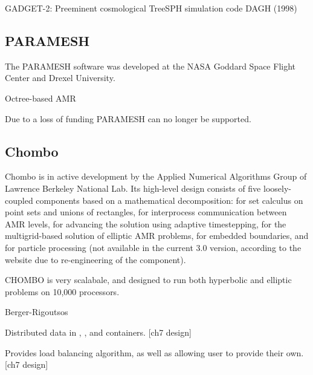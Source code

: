 \documentclass[14pt,letter]{article}
\begin{document}
GADGET-2: Preeminent cosmological TreeSPH simulation code
DAGH (1998)

\subsection{PARAMESH}

\nocite{wwwparamesh}
\nocite{MaOl00} %
\nocite{OlMa05}
\nocite{Ol06}

The PARAMESH software was developed at the NASA Goddard Space Flight
Center and Drexel University.

Octree-based AMR


Due to a loss of funding PARAMESH can no longer be supported.

\subsection{Chombo}

\nocite{wwwchombo}
\nocite{CoGr09}

Chombo is in active development by the Applied Numerical Algorithms
Group of Lawrence Berkeley National Lab.  Its high-level design
consists of five loosely-coupled components based on a mathematical
decomposition:  for set calculus on point sets and
unions of rectangles,  for interprocess communication
between AMR levels,  for advancing the solution
using adaptive timestepping,  for the
multigrid-based solution of elliptic AMR problems,  for
embedded boundaries, and  for particle processing
(not available in the current 3.0 version, according to the website
due to re-engineering of the component).

CHOMBO is very scalabale, and designed to run both hyperbolic and
elliptic problems on 10,000 processors.

Berger-Rigoutsos 


Distributed data in , , and 
 containers. [ch7 design]

Provides load balancing algorithm, as well as allowing user to provide their own.
[ch7 design]
\end{document}
